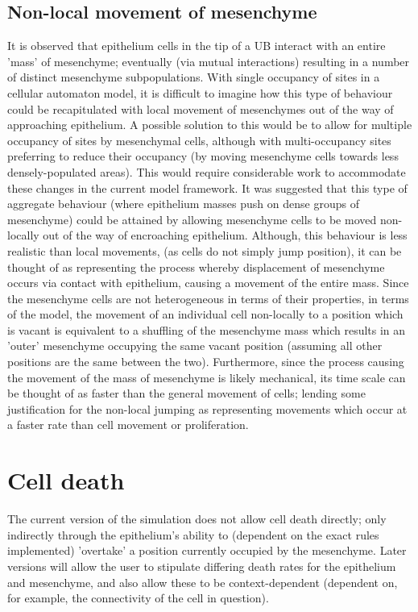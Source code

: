 \documentclass[pdftex,10pt,a4paper]{article}
\begin{document}
\subsection{Non-local movement of mesenchyme}\label{sec:nonlocal}
It is observed that epithelium cells in the tip of a UB interact with an entire 'mass' of mesenchyme; eventually (via mutual interactions) resulting in a number of distinct mesenchyme subpopulations. With single occupancy of sites in a cellular automaton model, it is difficult to imagine how this type of behaviour could be recapitulated with local movement of mesenchymes out of the way of approaching epithelium. A possible solution to this would be to allow for multiple occupancy of sites by mesenchymal cells, although with multi-occupancy sites preferring to reduce their occupancy (by moving mesenchyme cells towards less densely-populated areas). This would require considerable work to accommodate these changes in the current model framework. It was suggested that this type of aggregate behaviour (where epithelium masses push on dense groups of mesenchyme) could be attained by allowing mesenchyme cells to be moved non-locally out of the way of encroaching epithelium. Although, this behaviour is less realistic than local movements, (as cells do not simply jump position), it can be thought of as representing the process whereby displacement of mesenchyme occurs via contact with epithelium, causing a movement of the entire mass. Since the mesenchyme cells are not heterogeneous in terms of their properties, in terms of the model, the movement of an individual cell non-locally to a position which is vacant is equivalent to a shuffling of the mesenchyme mass which results in an 'outer' mesenchyme occupying the same vacant position (assuming all other positions are the same between the two). Furthermore, since the process causing the movement of the mass of mesenchyme is likely mechanical, its time scale can be thought of as faster than the general movement of cells; lending some justification for the non-local jumping as representing movements which occur at a faster rate than cell movement or proliferation.


\section{Cell death}
The current version of the simulation does not allow cell death directly; only indirectly through the epithelium's ability to (dependent on the exact rules implemented) 'overtake' a position currently occupied by the mesenchyme. Later versions will allow the user to stipulate differing death rates for the epithelium and mesenchyme, and also allow these to be context-dependent (dependent on, for example, the connectivity of the cell in question).
\end{document}
